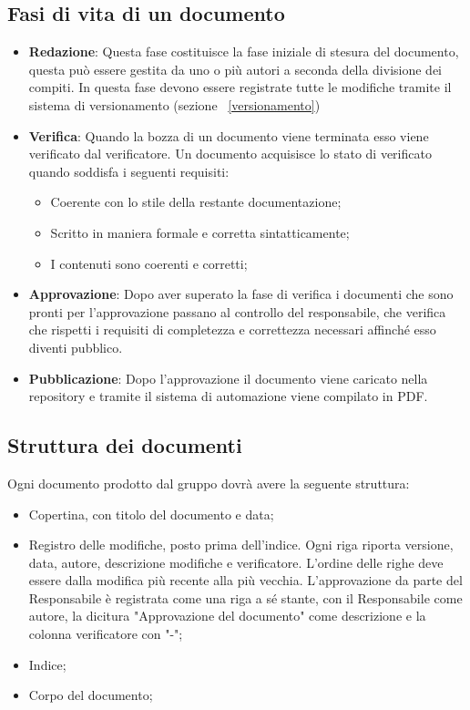 \subsection{Fasi di vita di un documento}
\begin{itemize}
	\item \textbf{Redazione}: Questa fase costituisce la fase iniziale di stesura del documento, questa può essere gestita da uno o più autori a seconda della divisione dei compiti. In questa fase devono essere registrate tutte le modifiche tramite il sistema di versionamento (sezione ~\ref{versionamento})
	\item \textbf{Verifica}: Quando la bozza di un documento viene terminata esso viene verificato dal verificatore. Un documento acquisisce lo stato di verificato quando soddisfa i seguenti requisiti:
	\begin{itemize}
		\item Coerente con lo stile della restante documentazione;
		\item Scritto in maniera formale e corretta sintatticamente;
		\item I contenuti sono coerenti e corretti;
	\end{itemize}
	\item \textbf{Approvazione}: Dopo aver superato la fase di verifica i documenti che sono pronti per l'approvazione passano al controllo del responsabile, che verifica che rispetti i requisiti di completezza e correttezza necessari affinché esso diventi pubblico.
	\item \textbf{Pubblicazione}: Dopo l'approvazione il documento viene caricato nella repository e tramite il sistema di automazione viene compilato in PDF.
\end{itemize}

\subsection{Struttura dei documenti}
Ogni documento prodotto dal gruppo dovrà avere la seguente struttura:
\begin{itemize}
	\item Copertina, con titolo del documento e data;
	\item Registro delle modifiche, posto prima dell'indice. Ogni riga riporta versione, data, autore, descrizione modifiche e verificatore. L'ordine delle righe deve essere dalla modifica più recente alla più vecchia. L'approvazione da parte del Responsabile è registrata come una riga a sé stante, con il Responsabile come autore, la dicitura "Approvazione del documento" come descrizione e la colonna verificatore con "-";
	\item Indice;
	\item Corpo del documento;
\end{itemize} 

